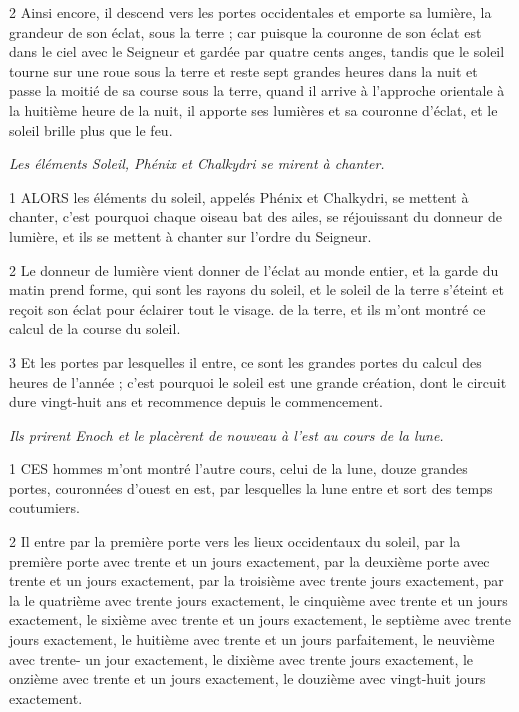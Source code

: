 \par 2 Ainsi encore, il descend vers les portes occidentales et emporte sa lumière, la grandeur de son éclat, sous la terre ; car puisque la couronne de son éclat est dans le ciel avec le Seigneur et gardée par quatre cents anges, tandis que le soleil tourne sur une roue sous la terre et reste sept grandes heures dans la nuit et passe la moitié de sa course sous la terre, quand il arrive à l'approche orientale à la huitième heure de la nuit, il apporte ses lumières et sa couronne d'éclat, et le soleil brille plus que le feu.


\par \textit{Les éléments Soleil, Phénix et Chalkydri se mirent à chanter.}

\par 1 ALORS les éléments du soleil, appelés Phénix et Chalkydri, se mettent à chanter, c'est pourquoi chaque oiseau bat des ailes, se réjouissant du donneur de lumière, et ils se mettent à chanter sur l'ordre du Seigneur.

\par 2 Le donneur de lumière vient donner de l'éclat au monde entier, et la garde du matin prend forme, qui sont les rayons du soleil, et le soleil de la terre s'éteint et reçoit son éclat pour éclairer tout le visage. de la terre, et ils m'ont montré ce calcul de la course du soleil.

\par 3 Et les portes par lesquelles il entre, ce sont les grandes portes du calcul des heures de l'année ; c'est pourquoi le soleil est une grande création, dont le circuit dure vingt-huit ans et recommence depuis le commencement.


\par \textit{Ils prirent Enoch et le placèrent de nouveau à l'est au cours de la lune.}

\par 1 CES hommes m'ont montré l'autre cours, celui de la lune, douze grandes portes, couronnées d'ouest en est, par lesquelles la lune entre et sort des temps coutumiers.

\par 2 Il entre par la première porte vers les lieux occidentaux du soleil, par la première porte avec trente et un jours exactement, par la deuxième porte avec trente et un jours exactement, par la troisième avec trente jours exactement, par la le quatrième avec trente jours exactement, le cinquième avec trente et un jours exactement, le sixième avec trente et un jours exactement, le septième avec trente jours exactement, le huitième avec trente et un jours parfaitement, le neuvième avec trente- un jour exactement, le dixième avec trente jours exactement, le onzième avec trente et un jours exactement, le douzième avec vingt-huit jours exactement.

